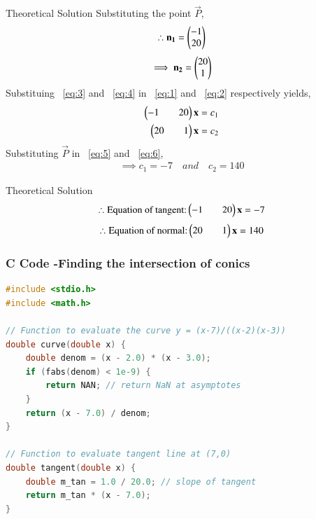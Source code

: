 \documentclass{beamer}
\begin{document}
\begin{frame}{Theoretical Solution}
Substituting the point $\vec{P}$,
\begin{align}
    \therefore \mathbf{n_1}=\begin{pmatrix}-1\\20\end{pmatrix} \label{eq:3}
\end{align}
\begin{align}
    \implies \mathbf{n_2}=\begin{pmatrix}20\\1\end{pmatrix} \label{eq:4}
\end{align}
Substituing ~\eqref{eq:3} and ~\eqref{eq:4} in ~\eqref{eq:1} and ~\eqref{eq:2} respectively yields,
\begin{align}
    \begin{pmatrix}-1&&20\end{pmatrix}\mathbf{x}=c_1 \label{eq:5} \\
    \begin{pmatrix}20&&1\end{pmatrix}\mathbf{x}=c_2 \label{eq:6}
\end{align}
Substituting $\vec{P}$ in ~\eqref{eq:5} and ~\eqref{eq:6},
\begin{align}
    \implies c_1=-7 \quad and \quad c_2=140
\end{align}

\end{frame}

\begin{frame}{Theoretical Solution}
\begin{align}
    \therefore \text{Equation of tangent:} \begin{pmatrix}-1&&20\end{pmatrix}\mathbf{x}=-7
\end{align}
\begin{align}
    \therefore \text{Equation of normal:} \begin{pmatrix}20&&1\end{pmatrix}\mathbf{x}=140
\end{align}

\end{frame}

\begin{frame}[fragile]
    \frametitle{C Code -Finding the intersection of conics}

    \begin{lstlisting}[language=C]
#include <stdio.h>
#include <math.h>

// Function to evaluate the curve y = (x-7)/((x-2)(x-3))
double curve(double x) {
    double denom = (x - 2.0) * (x - 3.0);
    if (fabs(denom) < 1e-9) {
        return NAN; // return NaN at asymptotes
    }
    return (x - 7.0) / denom;
}

// Function to evaluate tangent line at (7,0)
double tangent(double x) {
    double m_tan = 1.0 / 20.0; // slope of tangent
    return m_tan * (x - 7.0);
}
    \end{lstlisting}
\end{frame}
\end{document}
